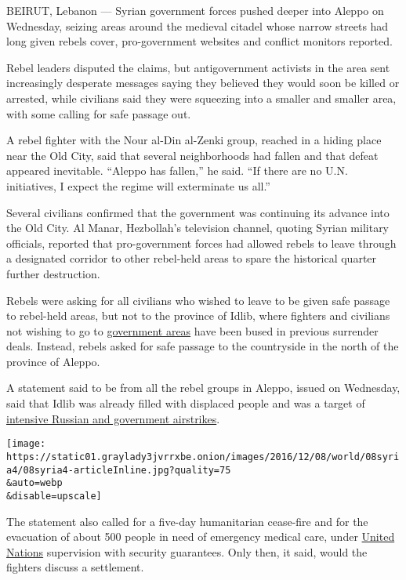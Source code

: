 BEIRUT, Lebanon --- Syrian government forces pushed deeper into Aleppo
on Wednesday, seizing areas around the medieval citadel whose narrow
streets had long given rebels cover, pro-government websites and
conflict monitors reported.

Rebel leaders disputed the claims, but antigovernment activists in the
area sent increasingly desperate messages saying they believed they
would soon be killed or arrested, while civilians said they were
squeezing into a smaller and smaller area, with some calling for safe
passage out.

A rebel fighter with the Nour al-Din al-Zenki group, reached in a hiding
place near the Old City, said that several neighborhoods had fallen and
that defeat appeared inevitable. ``Aleppo has fallen,'' he said. ``If
there are no U.N. initiatives, I expect the regime will exterminate us
all.''

Several civilians confirmed that the government was continuing its
advance into the Old City. Al Manar, Hezbollah's television channel,
quoting Syrian military officials, reported that pro-government forces
had allowed rebels to leave through a designated corridor to other
rebel-held areas to spare the historical quarter further destruction.

Rebels were asking for all civilians who wished to leave to be given
safe passage to rebel-held areas, but not to the province of Idlib,
where fighters and civilians not wishing to go to
\href{http://www.nytimes3xbfgragh.onion/2016/11/05/world/middleeast/aleppo-syria.html}{government
areas} have been bused in previous surrender deals. Instead, rebels
asked for safe passage to the countryside in the north of the province
of Aleppo.

A statement said to be from all the rebel groups in Aleppo, issued on
Wednesday, said that Idlib was already filled with displaced people and
was a target of
\href{http://www.nytimes3xbfgragh.onion/2016/12/05/world/middleeast/russia-lavrov-kerry-aleppo-rebels.html?rref=collection\%2Ftimestopic\%2FSyria\&action=click\&contentCollection=world\&region=stream\&module=stream_unit\&version=latest\&contentPlacement=3\&pgtype=collection}{intensive
Russian and government airstrikes}.

\texttt{[image: https://static01.graylady3jvrrxbe.onion/images/2016/12/08/world/08syria4/08syria4-articleInline.jpg?quality=75\\\&auto=webp\\\&disable=upscale]}

The statement also called for a five-day humanitarian cease-fire and for
the evacuation of about 500 people in need of emergency medical care,
under
\href{http://www.nytimes3xbfgragh.onion/2016/10/22/world/middleeast/syria-aleppo-un.html?rref=collection\%2Ftimestopic\%2FSyria\&action=click\&contentCollection=world\&region=stream\&module=stream_unit\&version=latest\&contentPlacement=53\&pgtype=collection}{United
Nations} supervision with security guarantees. Only then, it said, would
the fighters discuss a settlement.

